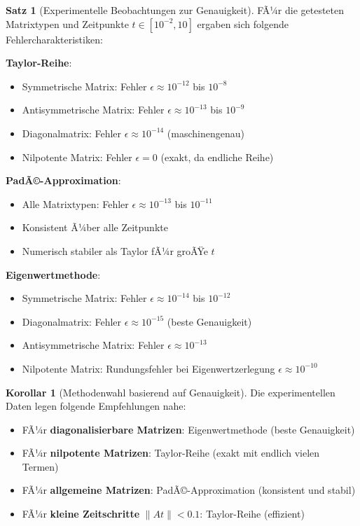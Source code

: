 ﻿\documentclass[a4paper,12pt]{report}
\theoremstyle{definition}
\newtheorem{satz}{Satz}
\newtheorem{korollar}{Korollar}
\begin{document}
	\begin{satz}[Experimentelle Beobachtungen zur Genauigkeit]
		FÃ¼r die getesteten Matrixtypen und Zeitpunkte $t \in [10^{-2}, 10]$ ergaben sich folgende Fehlercharakteristiken:
		
		\textbf{Taylor-Reihe}:
		\begin{itemize}
			\item Symmetrische Matrix: Fehler $\epsilon \approx 10^{-12}$ bis $10^{-8}$
			\item Antisymmetrische Matrix: Fehler $\epsilon \approx 10^{-13}$ bis $10^{-9}$
			\item Diagonalmatrix: Fehler $\epsilon \approx 10^{-14}$ (maschinengenau)
			\item Nilpotente Matrix: Fehler $\epsilon = 0$ (exakt, da endliche Reihe)
		\end{itemize}
		
		\textbf{PadÃ©-Approximation}:
		\begin{itemize}
			\item Alle Matrixtypen: Fehler $\epsilon \approx 10^{-13}$ bis $10^{-11}$
			\item Konsistent Ã¼ber alle Zeitpunkte
			\item Numerisch stabiler als Taylor fÃ¼r groÃŸe $t$
		\end{itemize}
		
		\textbf{Eigenwertmethode}:
		\begin{itemize}
			\item Symmetrische Matrix: Fehler $\epsilon \approx 10^{-14}$ bis $10^{-12}$
			\item Diagonalmatrix: Fehler $\epsilon \approx 10^{-15}$ (beste Genauigkeit)
			\item Antisymmetrische Matrix: Fehler $\epsilon \approx 10^{-13}$
			\item Nilpotente Matrix: Rundungsfehler bei Eigenwertzerlegung $\epsilon \approx 10^{-10}$
		\end{itemize}
	\end{satz}
	
	\begin{korollar}[Methodenwahl basierend auf Genauigkeit]
		Die experimentellen Daten legen folgende Empfehlungen nahe:
		\begin{itemize}
			\item FÃ¼r \textbf{diagonalisierbare Matrizen}: Eigenwertmethode (beste Genauigkeit)
			\item FÃ¼r \textbf{nilpotente Matrizen}: Taylor-Reihe (exakt mit endlich vielen Termen)
			\item FÃ¼r \textbf{allgemeine Matrizen}: PadÃ©-Approximation (konsistent und stabil)
			\item FÃ¼r \textbf{kleine Zeitschritte} $\|At\| < 0.1$: Taylor-Reihe (effizient)
		\end{itemize}
	\end{korollar}
	
\end{document}
